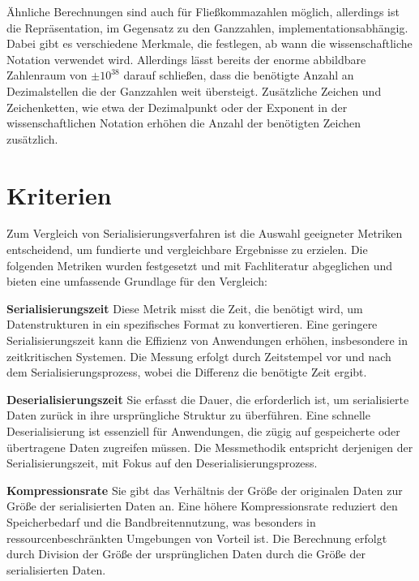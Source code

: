 \documentclass[ngerman]{seminarvorlage}
\begin{document}
Ähnliche Berechnungen sind auch für Fließkommazahlen möglich, allerdings ist die Repräsentation, im Gegensatz zu den Ganzzahlen, implementationsabhängig. Dabei gibt es verschiedene Merkmale, die festlegen, ab wann die wissenschaftliche Notation verwendet wird. Allerdings lässt bereits der enorme abbildbare Zahlenraum von $\pm10^{38}$ darauf schließen, dass die benötigte Anzahl an Dezimalstellen die der Ganzzahlen weit übersteigt. Zusätzliche Zeichen und Zeichenketten, wie etwa der Dezimalpunkt oder der Exponent in der wissenschaftlichen Notation erhöhen die Anzahl der benötigten Zeichen zusätzlich.

\section{Kriterien}

Zum Vergleich von Serialisierungsverfahren ist die Auswahl geeigneter Metriken entscheidend, um fundierte und vergleichbare Ergebnisse zu erzielen. Die folgenden Metriken wurden festgesetzt und mit Fachliteratur abgeglichen und bieten eine umfassende Grundlage für den Vergleich:

\textbf{Serialisierungszeit}\newline
Diese Metrik misst die Zeit, die benötigt wird, um Datenstrukturen in ein spezifisches Format zu konvertieren. Eine geringere Serialisierungszeit kann die Effizienz von Anwendungen erhöhen, insbesondere in zeitkritischen Systemen. Die Messung erfolgt durch Zeitstempel vor und nach dem Serialisierungsprozess, wobei die Differenz die benötigte Zeit ergibt.

\textbf{Deserialisierungszeit}\newline
Sie erfasst die Dauer, die erforderlich ist, um serialisierte Daten zurück in ihre ursprüngliche Struktur zu überführen. Eine schnelle Deserialisierung ist essenziell für Anwendungen, die zügig auf gespeicherte oder übertragene Daten zugreifen müssen. Die Messmethodik entspricht derjenigen der Serialisierungszeit, mit Fokus auf den Deserialisierungsprozess.

\textbf{Kompressionsrate}\newline
Sie gibt das Verhältnis der Größe der originalen Daten zur Größe der serialisierten Daten an. Eine höhere Kompressionsrate reduziert den Speicherbedarf und die Bandbreitennutzung, was besonders in ressourcenbeschränkten Umgebungen von Vorteil ist. Die Berechnung erfolgt durch Division der Größe der ursprünglichen Daten durch die Größe der serialisierten Daten.
\end{document}
